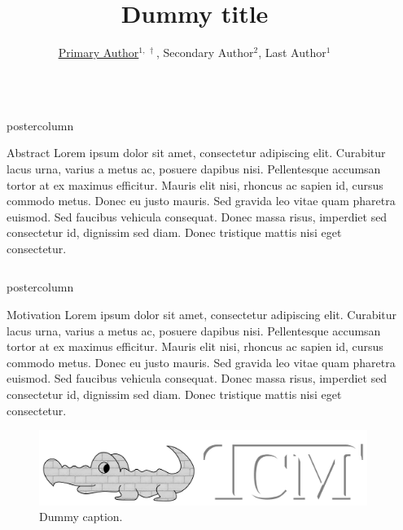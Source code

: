\documentclass{beamer}
\title{Dummy title}
\author{\underline{Primary Author}$^{1,\,\dagger}$, Secondary Author$^2$, Last Author$^1$}
\institute{$^1$ TCM Group, Cavendish Laboratory, University of Cambridge\\[.2in]$^2$ Department of Chemistry, University of Cambridge}
\newlength{\columnheight}
\begin{document}
\begin{frame}
\begin{columns}
  \begin{column}{.01\textwidth}
  \end{column}
  \begin{column}{.57\textwidth}
    \begin{beamercolorbox}[center]{postercolumn}
      \begin{minipage}{.98\textwidth}  %
        \parbox[t][\columnheight]{\textwidth}{ %
            \begin{myabstract}{Abstract}
                 Lorem ipsum dolor sit amet, consectetur adipiscing elit. Curabitur lacus urna, varius a metus ac, posuere dapibus nisi. Pellentesque accumsan tortor at ex maximus efficitur. Mauris elit nisi, rhoncus ac sapien id, cursus commodo metus. Donec eu justo mauris. Sed gravida leo vitae quam pharetra euismod. Sed faucibus vehicula consequat. Donec massa risus, imperdiet sed consectetur id, dignissim sed diam. Donec tristique mattis nisi eget consectetur.
        \end{myabstract}
  \begin{columns}
  \begin{column}{.48\textwidth}
    \begin{beamercolorbox}[left]{postercolumn}
        \begin{minipage}{\textwidth}  %

        \parbox[t][\columnheight]{\textwidth}{ %
            \begin{myblock}{Motivation}
                Lorem ipsum dolor sit amet, consectetur adipiscing elit. Curabitur lacus urna, varius a metus ac, posuere dapibus nisi. Pellentesque accumsan tortor at ex maximus efficitur. Mauris elit nisi, rhoncus ac sapien id, cursus commodo metus. Donec eu justo mauris. Sed gravida leo vitae quam pharetra euismod. Sed faucibus vehicula consequat. Donec massa risus, imperdiet sed consectetur id, dignissim sed diam. Donec tristique mattis nisi eget consectetur.

                \begin{figure}[h]
                \centering
                \includegraphics[width=\textwidth]{img/logo}
                \caption{Dummy caption.}
                \end{figure}


\end{myblock}}
\end{minipage}
\end{beamercolorbox}
\end{column}
\end{columns}}
\end{minipage}
\end{beamercolorbox}
\end{column}
\end{columns}
\end{frame}
\end{document}
